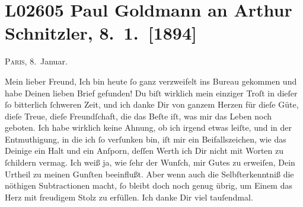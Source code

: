 

\section[Paul Goldmann an Arthur Schnitzler, 8. 1. {[}1894{]}]{L02605 Paul Goldmann an Arthur Schnitzler, 8. 1. {[}1894{]}}
\nopagebreak{}
\rehead{ }\normalsize\beginnumbering{}
\toendnotes[C]{\smallbreak\pagebreak[2]}
\toendnotes[C]{\smallbreak}
\toendnotes[C]{\smallbreak}
\pstart
           \raggedleft{}{\pb}\textsc{Paris,}{ }8. Januar.\pend
           
\pstart\center{}Mein lieber Freund,\pend\vspace{0.5em}
\pstart
           Ich bin heute{ }ſo ganz verzweifelt ins Bureau gekommen und habe Deinen lieben Brief gefunden! Du
               biſt wirklich mein einziger Troſt in dieſer{ }ſo bitterlich{ }ſchweren Zeit, und ich
               danke Dir von ganzem Herzen für dieſe Güte, dieſe Treue, dieſe Freundſchaft, die das
               Beſte iſt, was mir das Leben noch geboten. Ich habe wirklich keine Ahnung, ob ich
               irgend etwas leiſte, und in der Entmuthigung, in die ich{ }ſo verſunken bin, iſt mir
                  ein\strikeout{\textcolor{gray}{e}} Beifallszeichen, wie das Deinige ein Halt und {\pb}ein Anſporn, deſſen Werth ich Dir nicht mit Worten zu{ }ſchildern vermag. Ich weiß
               ja, wie{ }ſehr der Wunſch, mir Gutes zu erweiſen, Dein Urtheil zu meinen Gunſten
               beeinflußt. Aber wenn auch die Selbſterkenntniß die nöthigen Subtractionen macht,{ }ſo
               bleibt doch noch genug übrig, um Einem das Herz mit freudigem Stolz zu erfüllen. Ich
               danke Dir viel tauſendmal.\pend
           

